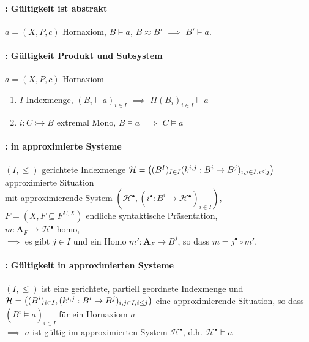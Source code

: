 \paragraph{: Gültigkeit ist abstrakt}
$a = (X, P, c)$ Hornaxiom, $B \models a$, $B \approx B'$ $\implies$ $B' \models a$.


\paragraph{: Gültigkeit Produkt und Subsystem}
$a = (X, P, c)$ Hornaxiom
\begin{enumerate}
\item $I$ Indexmenge, $(B_i \models a)_{i \in I}$ $\implies$ $\Pi (B_i)_{i \in I} \models a$
\item $i: C \rightarrowtail B$ extremal Mono, $B \models a$ $\implies $ $C \models a$
\end{enumerate}

\paragraph{: \homos in approximierte Systeme}
$(I, \leq)$ gerichtete Indexmenge $\mathcal{H} = \left( (B^I)_{I \in I} (k^{i,j}: B^i \rightarrow B^j)_{i,j \in I, i \leq j} \right)$ approximierte Situation \\ mit approximierende System 
$\left(\mathcal{H}{}^{\bullet},\left(i^{\bullet}:B^{i}\rightarrow\mathcal{H}{}^{\bullet}\right)_{i\in I}\right)$,
\\ $F=\left(X,F\subseteq F^{\Sigma,X}\right)$ endliche syntaktische Präsentation, \\
 $m:\mathbf{A}_{F}\rightarrow\mathcal{H}{}^{\bullet}$ homo, \\
$\implies$ es gibt $j\in I$ und ein Homo $m':\mathbf{A}_{F}\rightarrow B^{j}$, so dass  $m=j^{\bullet}\circ m'$.


\paragraph{: Gültigkeit in  approximierten Systeme}
$(I, \leq)$ ist eine gerichtete, partiell geordnete Indexmenge und $\mathcal{H} = \left( (B^i)_{i \in I}, (k^{i,j}: B^i \rightarrow B^j)_{i,j \in I, i \leq j} \right)$ eine approximierende Situation, so dass $(B^i \models a)_{i \in I}$ für ein Hornaxiom $a$ \\
$\implies $ $a$ ist gültig im approximierten System $\mathcal{H}^\bullet$, d.h. $\mathcal{H}^\bullet \models a$

